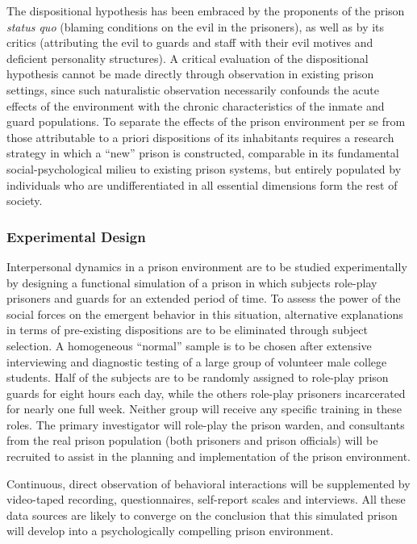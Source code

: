 \begin{refsection}
The dispositional hypothesis has been embraced by the proponents of the prison \emph{status quo} (blaming conditions on the evil in the prisoners), as well as by its critics (attributing the evil to guards and staff with their evil motives and deficient personality structures). A critical evaluation of the dispositional hypothesis cannot be made directly through observation in existing prison settings, since such naturalistic observation necessarily confounds the acute effects of the environment with the chronic characteristics of the inmate and guard populations. To separate the effects of the prison environment per se from those attributable to a priori dispositions of its inhabitants requires a research strategy in which a “new” prison is constructed, comparable in its fundamental social-psychological milieu to existing prison systems, but entirely populated by individuals who are undifferentiated in all essential dimensions form the rest of society.

\subsubsection{Experimental Design}
\label{experimentaldesign}

Interpersonal dynamics in a prison environment are to be studied experimentally by designing a functional simulation of a prison in which subjects role-play prisoners and guards for an extended period of time. To assess the power of the social forces on the emergent behavior in this situation, alternative explanations in terms of pre-existing dispositions are to be eliminated through subject selection. A homogeneous “normal” sample is to be chosen after extensive interviewing and diagnostic testing of a large group of volunteer male college students. Half of the subjects are to be randomly assigned to role-play prison guards for eight hours each day, while the others role-play prisoners incarcerated for nearly one full week. Neither group will receive any specific training in these roles. The primary investigator will role-play the prison warden, and consultants from the real prison population (both prisoners and prison officials) will be recruited to assist in the planning and implementation of the prison environment.

Continuous, direct observation of behavioral interactions will be supplemented by video-taped recording, questionnaires, self-report scales and interviews. All these data sources are likely to converge on the conclusion that this simulated prison will develop into a psychologically compelling prison environment.


\end{refsection}
